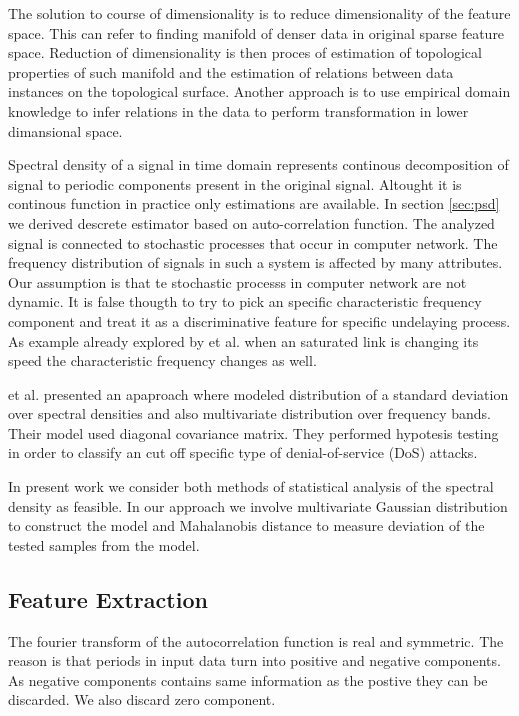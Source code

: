 The solution to course of dimensionality is to reduce dimensionality of the feature space.
This can refer to finding manifold of denser data in original sparse feature space.
Reduction of dimensionality is then proces of estimation of topological properties of such 
manifold and the estimation of relations between data instances on the topological surface. 
Another approach is to use empirical domain knowledge to infer relations in the
data to perform transformation in lower dimansional space.

Spectral density of a signal in time domain represents continous decomposition of signal to
periodic components present in the original signal. Altought it is continous function in
practice only estimations are available. In section \ref{sec:psd} we derived descrete estimator
based on auto-correlation function. The analyzed signal is connected to stochastic processes
that occur in computer network. The frequency distribution of signals in such a system is 
affected by many attributes. Our assumption is that te stochastic processs in computer network
are not dynamic. It is false thougth to try to pick an specific characteristic frequency component
and treat it as a discriminative feature for specific undelaying process. As example already 
explored by  et al. \cite{he2004spectral} when an saturated link is changing its 
speed the characteristic frequency changes as well.

 et al. \cite{chen2007tcp} presented an apaproach where modeled distribution
of a standard deviation over spectral densities and also multivariate distribution over
frequency bands. Their model used diagonal covariance matrix. They performed hypotesis 
testing in order to classify an cut off specific type of denial-of-service (DoS) attacks.

In present work we consider both methods of statistical analysis of the spectral density as feasible.
In our approach we involve multivariate Gaussian distribution to construct the model 
and Mahalanobis distance to measure deviation of the tested samples from the model.

\subsection{Feature Extraction}

The fourier transform of the autocorrelation function is real and symmetric.
 The reason is that periods in input data turn into positive and negative
components. As negative components contains same information as the postive they 
can be discarded. We also discard zero component.

